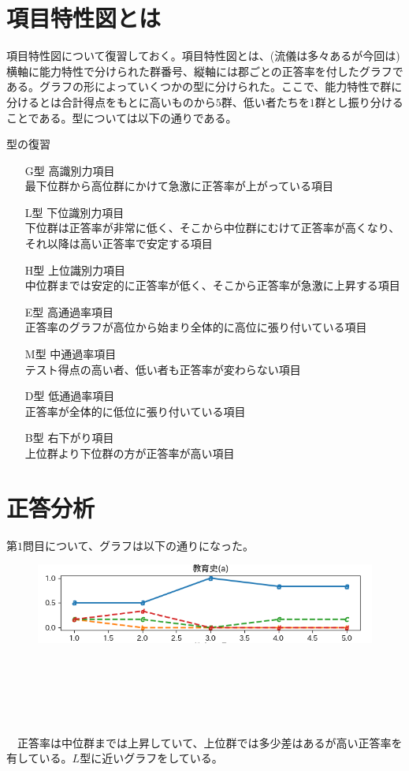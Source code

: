 \documentclass[12pt]{jarticle}
\begin{document}
\section{項目特性図とは}
項目特性図について復習しておく。項目特性図とは、(流儀は多々あるが今回は)横軸に能力特性で分けられた群番号、縦軸には郡ごとの正答率を付したグラフである。グラフの形によっていくつかの型に分けられた。ここで、能力特性で群に分けるとは合計得点をもとに高いものから$5$群、低い者たちを$1$群とし振り分けることである。型については以下の通りである。%
\begin{itembox}[l]{型の復習}
  \begin{itemize}
    \item[G型]  高識別力項目\\最下位群から高位群にかけて急激に正答率が上がっている項目
    \item[L型]  下位識別力項目\\下位群は正答率が非常に低く、そこから中位群にむけて正答率が高くなり、それ以降は高い正答率で安定する項目
    \item[H型]  上位識別力項目\\中位群までは安定的に正答率が低く、そこから正答率が急激に上昇する項目
    \item[E型]  高通過率項目\\正答率のグラフが高位から始まり全体的に高位に張り付いている項目
    \item[M型]  中通過率項目\\テスト得点の高い者、低い者も正答率が変わらない項目
    \item[D型]  低通過率項目\\正答率が全体的に低位に張り付いている項目
    \item[B型]  右下がり項目\\上位群より下位群の方が正答率が高い項目
  \end{itemize}
\end{itembox}
\newpage
\section{正答分析}
第$1$問目について、グラフは以下の通りになった。
\begin{figure}[H]
  \includegraphics[bb = -7 60 1 1,scale = 1.5]{Figure_1.png}
\end{figure}
\leavevmode \\
\\
\\
\\
\\
\ \ 正答率は中位群までは上昇していて、上位群では多少差はあるが高い正答率を有している。$L$型に近いグラフをしている。
\end{document}
